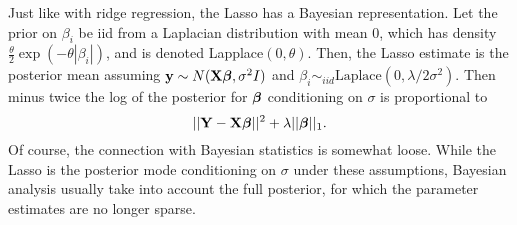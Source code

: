 Just like with ridge regression, the Lasso has a Bayesian representation. Let
the prior on $\beta_i$ be iid from a Laplacian distribution with mean 0, which has
density $\frac{\theta}{2}\exp(- \theta |\beta_i|)$, and is denoted Lapplace$(0, \theta)$. 
Then, the Lasso estimate is
the posterior mean assuming $\mathbf{y} \sim N(\mathbf{X} \boldsymbol{\beta}, \sigma^2 I)$ and 
$\beta_i \sim_{iid} \mbox{Laplace}(0, \lambda / 2\sigma^2)$. Then minus twice 
the log of the posterior for $\boldsymbol{\beta}$ conditioning on $\sigma$ is proportional to
$$
||\mathbf{Y} - \mathbf{X} \boldsymbol{\beta}||^2 + \lambda ||\boldsymbol{\beta}||_{1}.
$$
Of course, the connection with Bayesian statistics is somewhat loose. While the Lasso is the
posterior mode conditioning on $\sigma$ under these assumptions, Bayesian analysis usually
take into account the full posterior, for which the parameter estimates are no longer sparse.







